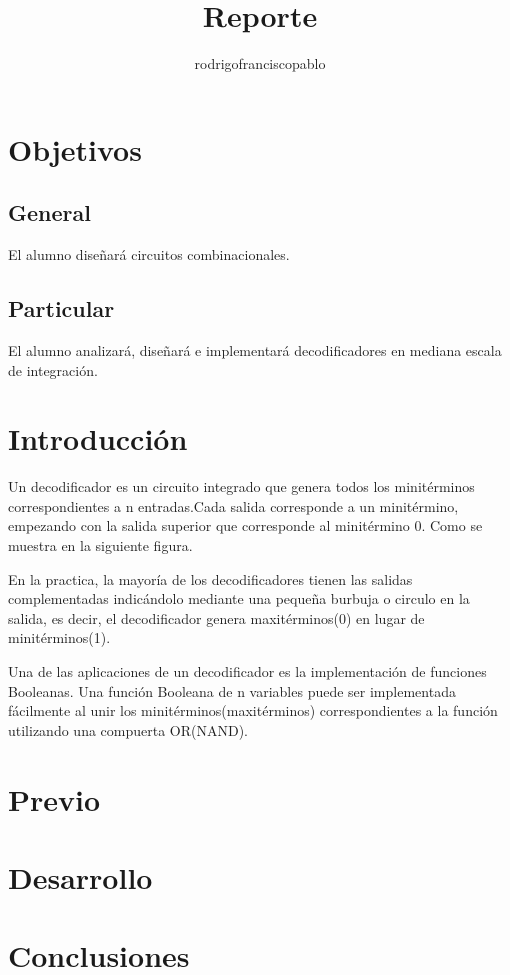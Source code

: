 \documentclass{mylib/reporteConCalif}
\title{Reporte}
\author{rodrigofranciscopablo }
\begin{document}
\coverPage

\section{Objetivos}

\subsection{General}

El alumno diseñará circuitos combinacionales.

\subsection{Particular}

El alumno analizará, diseñará e implementará decodificadores en mediana escala de integración.
\section{Introducción}

Un decodificador es un circuito integrado que genera todos los minitérminos correspondientes a n entradas.Cada salida corresponde a un minitérmino, empezando con la salida superior que corresponde al minitérmino 0. Como se muestra en la siguiente figura.


En la practica, la mayoría de los decodificadores tienen las salidas complementadas indicándolo mediante una pequeña burbuja o circulo en la salida, es decir, el decodificador genera maxitérminos(0) en lugar de minitérminos(1).

Una de las aplicaciones de un decodificador es la implementación de funciones Booleanas. Una función Booleana de n variables puede ser implementada fácilmente al unir los minitérminos(maxitérminos) correspondientes a la función utilizando una compuerta OR(NAND).


\newpage
\section{Previo}

\newpage
\section{Desarrollo}


\section{Conclusiones}
\end{document}
